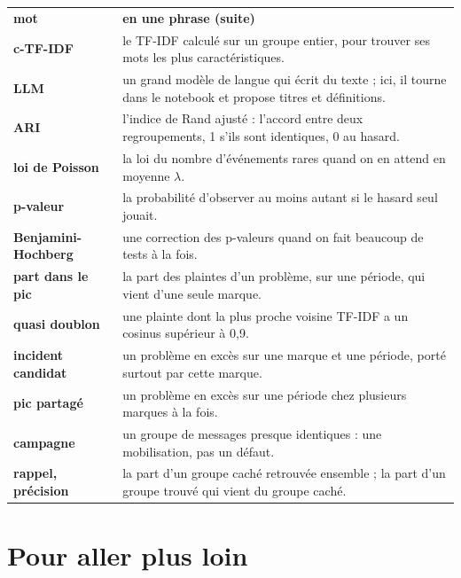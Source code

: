 \begin{tabularx}{\linewidth}{>{\bfseries\leavevmode\color{darkblue}}p{3.7cm}X}
\rowcolor{titlebg}\color{white}mot & \leavevmode\color{white}\textbf{en une phrase (suite)} \\
c-TF-IDF & le TF-IDF calculé sur un groupe entier, pour trouver ses mots les plus caractéristiques. \\
LLM & un grand modèle de langue qui écrit du texte ; ici, il tourne dans le notebook et propose titres et définitions. \\
ARI & l'indice de Rand ajusté : l'accord entre deux regroupements, 1 s'ils sont identiques, 0 au hasard. \\
loi de Poisson & la loi du nombre d'événements rares quand on en attend en moyenne $\lambda$. \\
p-valeur & la probabilité d'observer au moins autant si le hasard seul jouait. \\
Benjamini-Hochberg & une correction des p-valeurs quand on fait beaucoup de tests à la fois. \\
part dans le pic & la part des plaintes d'un problème, sur une période, qui vient d'une seule marque. \\
quasi doublon & une plainte dont la plus proche voisine TF-IDF a un cosinus supérieur à 0,9. \\
incident candidat & un problème en excès sur une marque et une période, porté surtout par cette marque. \\
pic partagé & un problème en excès sur une période chez plusieurs marques à la fois. \\
campagne & un groupe de messages presque identiques : une mobilisation, pas un défaut. \\
rappel, précision & la part d'un groupe caché retrouvée ensemble ; la part d'un groupe trouvé qui vient du groupe caché. \\
\end{tabularx}

\clearpage
\section{Pour aller plus loin}

